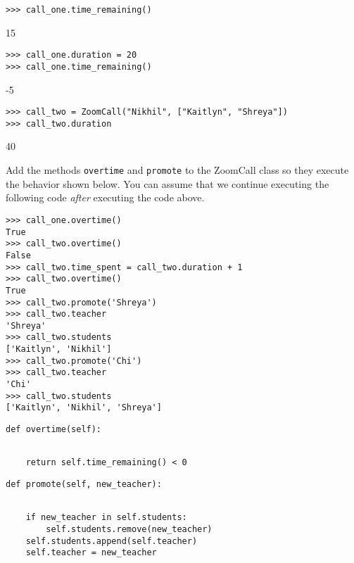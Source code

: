 \begin{blocksection}
\begin{lstlisting}
>>> call_one.time_remaining()
\end{lstlisting}
\begin{solution}[.2in]
15
\end{solution}

\begin{lstlisting}
>>> call_one.duration = 20
>>> call_one.time_remaining()
\end{lstlisting}
\begin{solution}[.2in]
-5
\end{solution}

\begin{lstlisting}
>>> call_two = ZoomCall("Nikhil", ["Kaitlyn", "Shreya"])
>>> call_two.duration
\end{lstlisting}
\begin{solution}[.2in]
40
\end{solution}
\end{blocksection}
\newpage
\question Add the methods \lstinline$overtime$ and \lstinline$promote$ to the ZoomCall class so they execute the behavior shown below. You can assume that we continue executing the following code \emph{after} executing the code above.

\begin{lstlisting}
>>> call_one.overtime()
True
>>> call_two.overtime()
False
>>> call_two.time_spent = call_two.duration + 1
>>> call_two.overtime()
True
>>> call_two.promote('Shreya')
>>> call_two.teacher
'Shreya'
>>> call_two.students
['Kaitlyn', 'Nikhil']
>>> call_two.promote('Chi')
>>> call_two.teacher
'Chi'
>>> call_two.students
['Kaitlyn', 'Nikhil', 'Shreya']
\end{lstlisting}
\bigbreak
\begin{lstlisting}
def overtime(self):
    
\end{lstlisting}

\begin{solution}[.5in]
\begin{lstlisting}
    return self.time_remaining() < 0
\end{lstlisting}
\end{solution}

\begin{lstlisting}
def promote(self, new_teacher):
    
\end{lstlisting}

\begin{solution}[1.5in]
\begin{lstlisting}
    if new_teacher in self.students:
        self.students.remove(new_teacher)
    self.students.append(self.teacher)
    self.teacher = new_teacher
\end{lstlisting}
\end{solution}